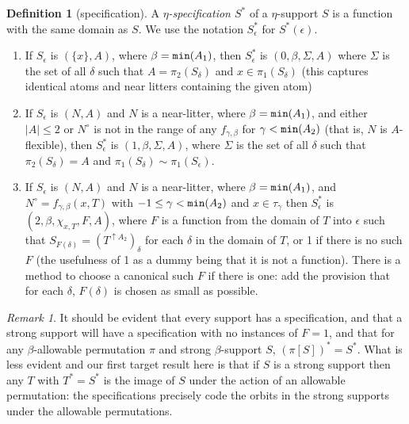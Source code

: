 \documentclass[112pt]{article}
\theoremstyle{definition}
\newtheorem{definition}[theorem]{Definition}
\theoremstyle{remark}
\newtheorem{remark}[theorem]{Remark}
\begin{document}
\begin{definition}[specification]
A {\em $\eta$-specification $S^*$\/} of a $\eta$-support $S$ is a function with the same domain as $S$.  We use the notation $S^*_\epsilon$ for $S^*(\epsilon)$.

\begin{enumerate}

\item  If $S_{\epsilon}$ is $(\{x\},A)$, where $\beta={\tt min}(A_1)$, then $S^*_\epsilon$ is $(0,\beta,\Sigma,A)$ where  $\Sigma$ is the set of all $\delta$ such that $A=\pi_2(S_\delta)$ and $x \in  \pi_1(S_\delta)$ (this captures identical atoms and near litters containing the given atom)

\item  If $S_\epsilon$ is $(N,A)$ and $N$ is a near-litter, where $\beta={\tt min}(A_1)$, and either $|A|\leq 2$ or $N^\circ$ is not in the range of any $f_{\gamma,\beta}$ for $\gamma<{\tt min}(A_2)$ (that is, $N$ is $A$-flexible), then $S^*_\epsilon$ is $(1,\beta,\Sigma,A)$, where $\Sigma$ is the set of all $\delta$ such that $\pi_2(S_\delta) = A$
and $\pi_1(S_\delta) \sim \pi_1(S_\epsilon)$. 

\item  If $S_\epsilon$ is $(N,A)$ and $N$ is a near-litter, where $\beta={\tt min}(A_1)$, and $N^\circ=f_{\gamma,\beta}(x,T)$ with {$-1\leq\gamma<{\tt min}(A_2)$} and $x\in \tau_\gamma$ then
$S^*_\epsilon$ is $(2,\beta,\chi_{x,T},F,A)$, where $F$ is a function from the domain of $T$ into $\epsilon$
such that $S_{F(\delta)} = (T^{\uparrow A_2})_\delta$ for each $\delta$ in the domain of $T$, or 1 if there is no such $F$ (the usefulness of 1 as a dummy being that it is not a function).  There is a method to choose a canonical such $F$ if there is one:  add the provision that for each $\delta$, $F(\delta)$ is chosen as small as possible. 

\end{enumerate}
\end{definition}

\begin{remark}
It should be evident that every support has a specification, and that a strong support will have a specification with no instances of $F = 1$, and that for any $\beta$-allowable permutation $\pi$ and strong $\beta$-support $S$,
$(\pi[S])^* = S^*$.  What is less evident and our first target result here is that if $S$ is a strong support then any $T$ with $T^* = S^*$ is the image of $S$ under the action of an allowable permutation:  the specifications precisely code the orbits in the strong supports under the allowable permutations.
\end{remark}
\end{document}
